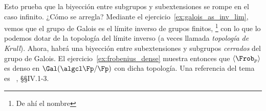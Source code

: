 \documentclass[11pt, reqno]{amsart}
\begin{document}
Esto prueba que la biyección entre subgrupos y subextensiones se rompe en el caso infinito.
¿Cómo se arregla?
Mediante el ejercicio~\ref{ex:galois_as_inv_lim}, vemos que el grupo de Galois es el límite inverso de grupos finitos,%
\footnote{De ahí el nombre }
con lo que lo podemos dotar de la topología del límite inverso (a veces llamada \emph{topología de Krull}).
Ahora, habrá una biyección entre subextensiones y subgrupos \emph{cerrados} del grupo de Galois.
El ejercicio~\ref{ex:frobenius_dense} muestra entonces que $\langle \Frob_p \rangle$ es denso en $\Gal(\algcl\Fp/\Fp)$ con dicha topología.
Una referencia del tema es
\citeauthor{neukirch:algebraic}~\cite{neukirch:algebraic}, \S\S IV.1-3.

\nocite{lang:algebra}

\printbibliography
\end{document}
